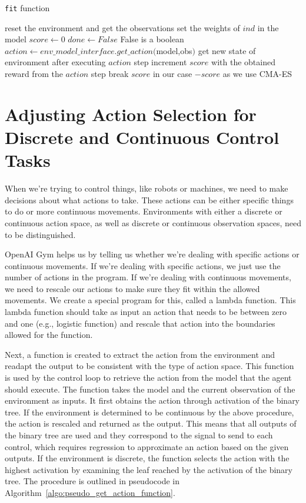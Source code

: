 \begin{algorithm}
\caption{\texttt{fit} function}
\label{algo:pseudo_fit_function}
\begin{algorithmic}
\State reset the environment and get the observations
\State set the weights of $ind$ in the model
\State $score \gets 0$
\State $ done \gets False$ \Comment False is a boolean
    \State $action \gets env\_model\_interface.get\_action($model,obs$)$
    \State get new state of environment after executing $action$ step
    \State increment $score$ with the obtained reward from the $action$ step
        \State break
    \EndIf
\EndFor
\Return $score$ \Comment in our case $-score$ as we use CMA-ES
\EndFunction
\end{algorithmic}
\end{algorithm}


\section{Adjusting Action Selection for Discrete and Continuous Control Tasks}
\label{env_model_interface}

When we're trying to control things, like robots or machines, we need to make decisions about what actions to take. These actions can be either specific things to do or more continuous movements. Environments with either a discrete or continuous action space, as well as discrete or continuous observation spaces, need to be distinguished.

OpenAI Gym helps us by telling us whether we're dealing with specific actions or continuous movements. If we're dealing with specific actions, we just use the number of actions in the program. If we're dealing with continuous movements, we need to rescale our actions to make sure they fit within the allowed movements. We create a special program for this, called a lambda function. This lambda function should take as input an action that needs to be between zero and one (e.g., logistic function) and rescale that action into the boundaries allowed for the function.

Next, a function is created to extract the action from the environment and readapt the output to be consistent with the type of action space. This function is used by the control loop to retrieve the action from the model that the agent should execute. The function takes the model and the current observation of the environment as inputs. It first obtains the action through activation of the binary tree. If the environment is determined to be continuous by the above procedure, the action is rescaled and returned as the output. This means that all outputs of the binary tree are used and they correspond to the signal to send to each control, which requires regression to approximate an action based on the given outputs. If the environment is discrete, the function selects the action with the highest activation by examining the leaf reached by the activation of the binary tree. The procedure is outlined in pseudocode in Algorithm~\ref{algo:pseudo_get_action_function}.


